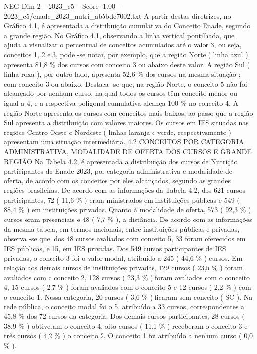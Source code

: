 \begin{textsample}{NEG Dim 2 – 2023\_c5 – Score -1.00 – 2023\_c5/enade\_2023\_nutri\_ab5bde7002.txt}
A partir destas diretrizes, no Gráfico 4.1, é apresentada a distribuição cumulativa do Conceito Enade, segundo a grande região.
No Gráfico 4.1, observando a linha vertical pontilhada, que ajuda a visualizar o percentual de conceitos acumulados até o valor 3, ou seja, conceitos 1, 2 e 3, pode -se notar, por exemplo, que a região Norte ( linha azul ) apresenta 81,8 \% dos cursos com conceito 3 ou abaixo deste valor.
A região Sul ( linha roxa ), por outro lado, apresenta 52,6 \% dos cursos na mesma situação : com conceito 3 ou abaixo.
Destaca -se que, na região Norte, o conceito 5 não foi alcançado por nenhum curso, na qual todos os cursos têm conceito menor ou igual a 4, e a respectiva poligonal cumulativa alcança 100 \% no conceito 4.
A região Norte apresenta os cursos com conceitos mais baixos, ao passo que a região Sul apresenta a distribuição com valores maiores.
Os cursos em IES situadas nas regiões Centro-Oeste e Nordeste ( linhas laranja e verde, respectivamente ) apresentam uma situação intermediária. 4.2 CONCEITOS POR CATEGORIA ADMINISTRATIVA, MODALIDADE DE OFERTA DOS CURSOS E GRANDE REGIÃO Na Tabela 4.2, é apresentada a distribuição dos cursos de Nutrição participantes do Enade 2023, por categoria administrativa e modalidade de oferta, de acordo com os conceitos por eles alcançados, segundo as grandes regiões brasileiras.
De acordo com as informações da Tabela 4.2, dos 621 cursos participantes, 72 ( 11,6 \% ) eram ministrados em instituições públicas e 549 ( 88,4 \% ) em instituições privadas.
Quanto à modalidade de oferta, 573 ( 92,3 \% ) cursos eram presenciais e 48 ( 7,7 \% ), a distância.
De acordo com as informações da mesma tabela, em termos nacionais, entre instituições públicas e privadas, observa -se que, dos 48 cursos avaliados com conceito 5, 33 foram oferecidos em IES públicas, e 15, em IES privadas.
Dos 549 cursos participantes de IES privadas, o conceito 3 foi o valor modal, atribuído a 245 ( 44,6 \% ) cursos.
Em relação aos demais cursos de instituições privadas, 129 cursos ( 23,5 \% ) foram avaliados com o conceito 2, 128 cursos ( 23,3 \% ) foram avaliados com o conceito 4, 15 cursos ( 2,7 \% ) foram avaliados com o conceito 5 e 12 cursos ( 2,2 \% ) com o conceito 1.
Nessa categoria, 20 cursos ( 3,6 \% ) ficaram sem conceito ( SC ).
Na rede pública, o conceito modal foi o 5, atribuído a 33 cursos, correspondentes a 45,8 \% dos 72 cursos da categoria.
Dos demais cursos participantes, 28 cursos ( 38,9 \% ) obtiveram o conceito 4, oito cursos ( 11,1 \% ) receberam o conceito 3 e três cursos ( 4,2 \% ) o conceito 2.
O conceito 1 foi atribuído a nenhum curso ( 0,0 \% ).

\end{textsample}
